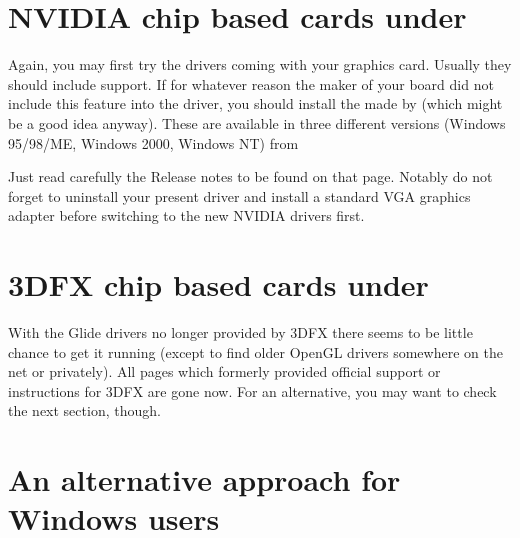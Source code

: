\section{NVIDIA chip based cards under \label{nvidiawindows}}

Again, you may first try the drivers coming with your graphics card. Usually they should
include  support. If for whatever reason the maker of your board did not
include this feature into the driver, you should install the  made by  (which might be a good idea
anyway). These are available in three different versions (Windows 95/98/ME, Windows 2000,
Windows NT) from
 \medskip

  \medskip

\noindent
 Just read carefully the Release notes to be found on that page. Notably do not
forget to uninstall your present driver and install a standard VGA graphics adapter
before switching to the new NVIDIA drivers first.


\section{3DFX chip based cards under \label{3dfxwindows}}

With the Glide drivers no longer provided by 3DFX there seems to be little chance to get
it running (except to find older OpenGL drivers somewhere on the net or privately). All
pages which formerly provided official support or instructions for 3DFX are gone now. For
an alternative, you may want to check the next section, though.


\section{An alternative approach for Windows users}

